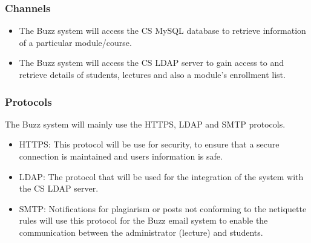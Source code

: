 \subsubsection*{Channels}
\begin{itemize}
\item The Buzz system will access the CS MySQL database to retrieve information of a particular module/course.
\item The Buzz system will access the CS LDAP server to gain access to and retrieve details of students,  lectures and also a module's enrollment  list.
\end{itemize}

\subsubsection*{Protocols}
The Buzz system will mainly use the HTTPS, LDAP and SMTP protocols.
\begin{itemize}
\item HTTPS: This protocol will be use for security, to ensure that a secure connection is maintained and users information is safe. 
\item LDAP: The protocol that will be used for the integration of the system with the CS LDAP server.
\item SMTP: Notifications for plagiarism or posts not conforming to the netiquette rules will use this protocol for the Buzz email system to enable the communication between the administrator (lecture) and students.  
\end{itemize}